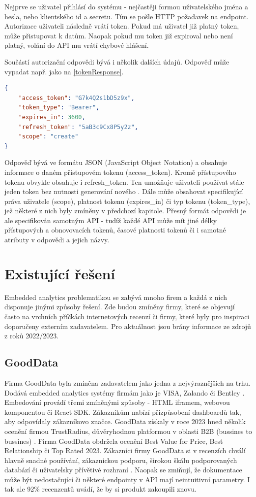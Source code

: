 \documentclass[czech, bc, kiv, he, iso690numb]{fasthesis}
\begin{document}
Nejprve se uživatel přihlásí do systému - nejčastěji formou uživatelského jména a hesla, nebo klientského id a secretu. Tím se pošle HTTP požadavek na endpoint. Autorizace uživateli následně
vrátí token. Pokud má uživatel již platný token, může přistupovat k datům. Naopak pokud mu token již expiroval nebo není platný, volání do API mu vrátí chybové hlášení. 

Součástí autorizační odpovědi bývá i několik dalších údajů. Odpověď může vypadat např. jako na \ref{tokenResponse}. 

\begin{lstlisting}[language=json, caption={Ukázková odpověď autorizačního serveru}, label=tokenResponse]
{
	"access_token": "G7k4Q2s1bD5z9x",
	"token_type": "Bearer",
	"expires_in": 3600,
	"refresh_token": "5aB3c9Cx8P5y2z",
	"scope": "create"
}
\end{lstlisting}
	  
Odpověď bývá ve formátu JSON (JavaScript Object Notation) a obsahuje informace o daném přístupovém tokenu (access\_token). Kromě přístupového tokenu obvykle obsahuje i refresh\_token. Ten umožňuje uživateli 
používat stále jeden token bez nutnosti generování nového \cite{oauthResponseExample}. Dále může obsahovat specifikující práva uživatele (scope), platnost tokenu (expires\_in) či typ tokenu (token\_type), jež některé z nich byly zmíněny v předchozí kapitole.
Přesný formát odpovědi je ale specifikován samotným API - tudíž každé API může mít jiné délky přístupových a obnovovacích tokenů, časové platnosti tokenů či i samotné atributy v odpovědi a jejich názvy.
%
%
\section{Existující řešení}
Embedded analytics problematikou se zabývá mnoho firem a každá z nich disponuje jinými způsoby řešení. Zde budou zmíněny firmy, které se objevují často na vrchních příčkách
internetových recenzí či firmy, které byly pro inspiraci doporučeny externím zadavatelem. Pro aktuálnost jsou brány informace ze zdrojů z roků 2022/2023.
\subsection{GoodData}
Firma GoodData byla zmíněna zadavatelem jako jedna z nejvýraznějších na trhu. Dodává embedded analytics systémy firmám jako je VISA, Zalando či Bentley \cite{goodDataEmbeddingPlatform}. 
Embedování provádí třemi zmíněnými způsoby - HTML iframem, webovou komponentou či React SDK. Zákazníkům nabízí přizpůsobení dashboardů tak, aby odpovídaly zákazníkovo značce. GoodData získaly
v roce 2023 hned několik ocenění firmou TrustRadius, důvěryhodnou platformou v oblasti B2B (bussines to bussines) \cite{trustRadiusDiscusionGoodData}. Firma GoodData obdržela ocenění Best Value for Price,
Best Relationship či Top Rated 2023. Zákazníci firmy GoodData si v recenzích chválí hlavně snadné používání, zákaznickou podporu, širokou škálu podporovaných databází či uživatelsky přívětivé
rozhraní \cite{trustRadiusDiscusionGoodData}. Naopak se zmiňují, že dokumentace může být nedostačující či některé endpointy v API mají neintuitivní parametry. I tak ale 92\% recenzentů uvádí,
že by si produkt zakoupili znovu.
\end{document}
